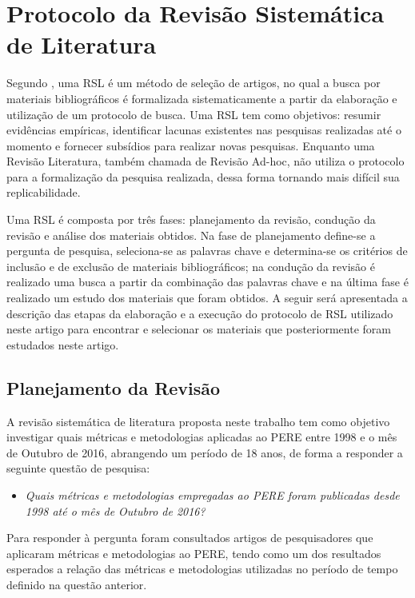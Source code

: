 \section{\esp Protocolo da Revisão Sistemática de Literatura }\label{protocolo}

Segundo , uma \ac{RSL} é um método de seleção de artigos, no qual a busca por materiais bibliográficos é formalizada sistematicamente a partir da elaboração e utilização de um protocolo de busca. Uma \ac{RSL} tem como objetivos: resumir evidências empíricas, identificar lacunas existentes nas pesquisas realizadas até o momento e fornecer subsídios para realizar novas pesquisas.
Enquanto uma Revisão Literatura, também chamada de Revisão Ad-hoc, não utiliza o protocolo para a formalização da pesquisa realizada, dessa forma tornando mais difícil sua replicabilidade.

Uma \ac{RSL} é  composta por três fases: planejamento da revisão, condução da revisão e análise dos materiais obtidos.
Na fase de planejamento define-se a pergunta de pesquisa, seleciona-se as palavras chave e determina-se os critérios de inclusão e de exclusão de materiais bibliográficos; na condução da revisão é realizado uma busca a partir da combinação das palavras chave e na última fase  é realizado um estudo dos materiais que foram obtidos. A seguir será apresentada a descrição das etapas da elaboração e a execução do protocolo de \ac{RSL} utilizado neste artigo para encontrar e selecionar os materiais que posteriormente foram estudados neste artigo.

\subsection{Planejamento da Revisão}

A revisão sistemática de literatura proposta neste trabalho tem como objetivo investigar quais métricas e metodologias aplicadas ao \ac{PERE} entre 1998 e o mês de Outubro de 2016, abrangendo um período de 18 anos, de forma a responder a seguinte questão de pesquisa:

\begin{itemize}
\item \emph{Quais métricas e metodologias empregadas ao \acl{PERE} foram publicadas desde 1998 até o mês de Outubro de 2016?}
\end{itemize}

Para responder à pergunta foram consultados artigos de pesquisadores que aplicaram métricas e metodologias ao \ac{PERE}, tendo como um dos resultados esperados a relação das métricas e metodologias utilizadas no período de tempo definido na questão anterior. 

